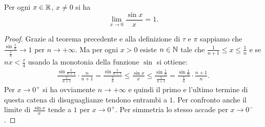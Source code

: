\begin{theorem}
  \label{th:limite_notevole_sin}%
Per ogni $x\in{\mathbb R}$, $x\neq 0$ si ha 
\[
\lim_{x\to 0}\frac{\sin x}{x} = 1.
\]
\end{theorem}
%
\begin{proof}
Grazie al teorema precedente e alla definizione di $\tau$ e $\pi$ 
sappiamo che $\frac{\sin \frac 1 n}{\frac 1 n}\to 1$ per $n\to +\infty$.
Ma per ogni $x>0$ esiste $n\in {\mathbb N}$ tale che 
$\frac 1 {n+1} \le x \le \frac 1 n$ 
e se $nx<\frac \tau 4$ usando la monotonia della funzione $\sin$ 
si ottiene:
\begin{align*}
  \frac{\sin \frac 1{n+1}}{\frac 1 {n+1}} 
  \cdot \frac{n}{n+1}
  =\frac{\sin \frac 1{n+1}}{\frac 1 {n}} 
  \le \frac{\sin x}{x}
  \le \frac{\sin \frac 1 n}{\frac 1 {n+1}}
  = \frac{\sin \frac 1 n}{\frac 1 n} \cdot \frac{n+1}{n}.
\end{align*}
Per $x\to 0^+$ si ha ovviamente $n\to+\infty$ e quindi 
il primo e l'ultimo termine di questa catena di disuguaglianze 
tendono entrambi a $1$.
Per confronto anche il limite di $\frac{\sin x}{x}$ tende 
a $1$ per $x\to 0^+$.
Per simmetria lo stesso accade per $x\to 0^-$.
\end{proof}

